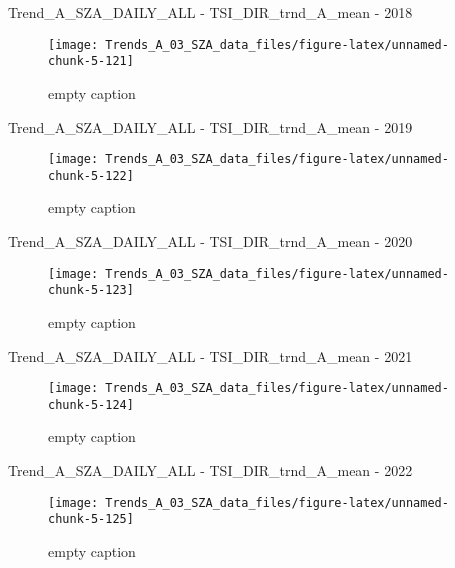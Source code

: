 \documentclass[
  10pt,
  a4paper,oneside]{article}
\begin{document}
Trend\_A\_SZA\_DAILY\_ALL - TSI\_DIR\_trnd\_A\_mean - 2018

\begin{figure}[!ht]

{\centering \texttt{[image: Trends\_A\_03\_SZA\_data\_files/figure-latex/unnamed-chunk-5-121]} 

}

\caption{ empty caption }\label{fig:unnamed-chunk-5-121}
\end{figure}

Trend\_A\_SZA\_DAILY\_ALL - TSI\_DIR\_trnd\_A\_mean - 2019

\begin{figure}[!ht]

{\centering \texttt{[image: Trends\_A\_03\_SZA\_data\_files/figure-latex/unnamed-chunk-5-122]} 

}

\caption{ empty caption }\label{fig:unnamed-chunk-5-122}
\end{figure}

Trend\_A\_SZA\_DAILY\_ALL - TSI\_DIR\_trnd\_A\_mean - 2020

\begin{figure}[!ht]

{\centering \texttt{[image: Trends\_A\_03\_SZA\_data\_files/figure-latex/unnamed-chunk-5-123]} 

}

\caption{ empty caption }\label{fig:unnamed-chunk-5-123}
\end{figure}

Trend\_A\_SZA\_DAILY\_ALL - TSI\_DIR\_trnd\_A\_mean - 2021

\begin{figure}[!ht]

{\centering \texttt{[image: Trends\_A\_03\_SZA\_data\_files/figure-latex/unnamed-chunk-5-124]} 

}

\caption{ empty caption }\label{fig:unnamed-chunk-5-124}
\end{figure}

Trend\_A\_SZA\_DAILY\_ALL - TSI\_DIR\_trnd\_A\_mean - 2022

\begin{figure}[!ht]

{\centering \texttt{[image: Trends\_A\_03\_SZA\_data\_files/figure-latex/unnamed-chunk-5-125]} 

}

\caption{ empty caption }\label{fig:unnamed-chunk-5-125}
\end{figure}
\end{document}
